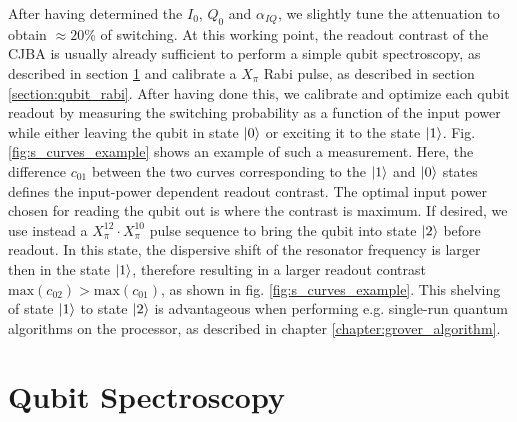 After having determined the $I_0$, $Q_0$ and $\alpha_{IQ}$, we slightly tune the attenuation to obtain $\approx 20\%$  of switching. At this working point, the readout contrast of the CJBA is usually already sufficient to perform a simple qubit spectroscopy, as described in section \ref{section:qubit_spectroscopy} and calibrate a $X_\pi$ Rabi pulse, as described in section \ref{section:qubit_rabi}. After having done this, we calibrate and optimize each qubit readout by measuring the switching probability as a function of the input power while either leaving the qubit in state $\left| 0 \right>$ or exciting it to the state $\left| 1 \right>$. Fig. \ref{fig:s_curves_example} shows an example of such a measurement. Here, the difference $c_{01}$ between the two curves corresponding to the $\left| 1 \right>$ and $\left| 0 \right>$ states defines the input-power dependent readout contrast. The optimal  input power chosen for reading the qubit out is where the contrast is maximum. If desired, we use instead a $X_\pi^{12}\cdot X_\pi^{10}$ pulse sequence to bring the qubit into state $\left| 2 \right>$ before readout. In this state, the dispersive shift of the resonator frequency is larger then in the state $\left| 1 \right>$, therefore resulting in a larger readout contrast $\mathrm{max}(c_{02})>\mathrm{max}(c_{01})$, as shown in fig. \ref{fig:s_curves_example}. This shelving of state $\left| 1 \right>$ to state $\left| 2 \right>$ is advantageous when performing e.g. single-run quantum algorithms on the processor, as described in chapter \ref{chapter:grover_algorithm}.

\section{Qubit Spectroscopy} \label{section:qubit_spectroscopy}

